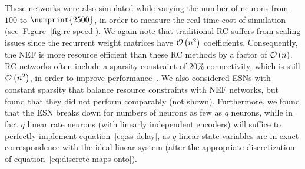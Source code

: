 These networks were also simulated while varying the number of neurons from $100$ to $\numprint{2500}$, in order to measure the real-time cost of simulation (see~Figure~\ref{fig:rc-speed}).
We again note that traditional RC suffers from scaling issues since the recurrent weight matrices have $\mathcal{O}\left({ n^2 }\right)$ coefficients.
Consequently, the NEF is more resource efficient than these RC methods by a factor of $\mathcal{O}\left({ n }\right)$.
RC networks often include a sparsity constraint of $20\%$ connectivity, which is still $\mathcal{O}\left({n^2}\right)$, in order to improve performance~\citep{lukovsevivcius2012practical, lukovsevicius2012reservoir}.
We also considered ESNs with constant sparsity that balance resource constraints with NEF networks, but found that they did not perform comparably (not shown).
Furthermore, we found that the ESN breaks down for numbers of neurons as few as $q$ neurons, while in fact $q$ linear rate neurons (with linearly independent encoders) will suffice to perfectly implement equation~\ref{eq:ss-delay}, as $q$ linear state-variables are in exact correspondence with the ideal linear system (after the appropriate discretization of equation~\ref{eq:discrete-maps-onto}).


